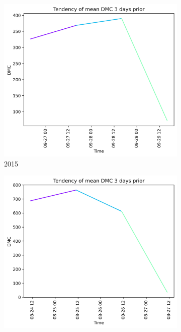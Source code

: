 \begin{figure}[h]
	\centering
	\caption{DMC values 3 days prior to wildfire}
	\begin{subfigure}{0.3\textwidth}
		\centering
		\includegraphics[width=\textwidth]{graphs/3days/2015_3daysprior_tendency_graph_DMC.png}
		\caption{2015}
		\label{fig:dmc_prior_3_days_2015}
	\end{subfigure}
	\hfill
	\begin{subfigure}{0.3\textwidth}
		\centering
		\includegraphics[width=\textwidth]{graphs/3days/2019_3daysprior_tendency_graph_DMC.png}

\end{subfigure}
\end{figure}
